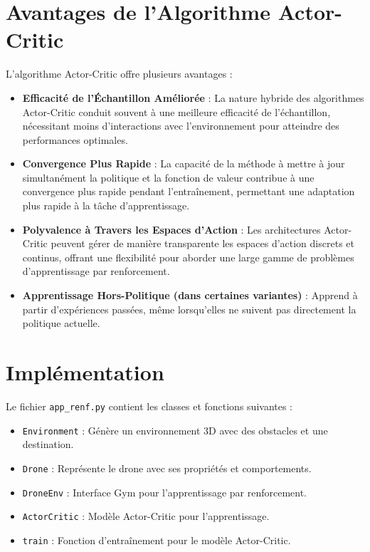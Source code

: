 \documentclass[a4paper, 12pt]{article}
\begin{document}
\section{Avantages de l'Algorithme Actor-Critic}
L'algorithme Actor-Critic offre plusieurs avantages :
\begin{itemize}
    \item \textbf{Efficacité de l'Échantillon Améliorée} : La nature hybride des algorithmes Actor-Critic conduit souvent à une meilleure efficacité de l'échantillon, nécessitant moins d'interactions avec l'environnement pour atteindre des performances optimales.
    \item \textbf{Convergence Plus Rapide} : La capacité de la méthode à mettre à jour simultanément la politique et la fonction de valeur contribue à une convergence plus rapide pendant l'entraînement, permettant une adaptation plus rapide à la tâche d'apprentissage.
    \item \textbf{Polyvalence à Travers les Espaces d'Action} : Les architectures Actor-Critic peuvent gérer de manière transparente les espaces d'action discrets et continus, offrant une flexibilité pour aborder une large gamme de problèmes d'apprentissage par renforcement.
    \item \textbf{Apprentissage Hors-Politique (dans certaines variantes)} : Apprend à partir d'expériences passées, même lorsqu'elles ne suivent pas directement la politique actuelle.
\end{itemize}

\section{Implémentation}
Le fichier \texttt{app\_renf.py} contient les classes et fonctions suivantes :
\begin{itemize}
    \item \texttt{Environment} : Génère un environnement 3D avec des obstacles et une destination.
    \item \texttt{Drone} : Représente le drone avec ses propriétés et comportements.
    \item \texttt{DroneEnv} : Interface Gym pour l'apprentissage par renforcement.
    \item \texttt{ActorCritic} : Modèle Actor-Critic pour l'apprentissage.
    \item \texttt{train} : Fonction d'entraînement pour le modèle Actor-Critic.
\end{itemize}
\end{document}
